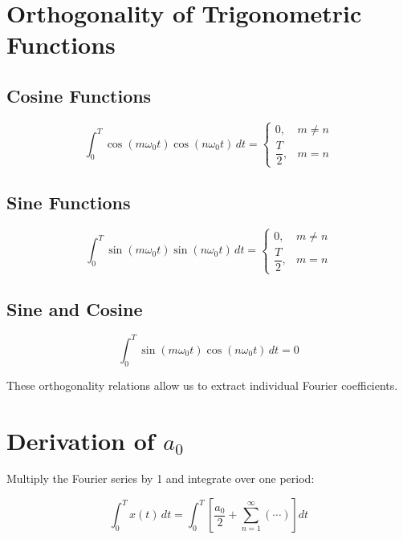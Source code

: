 \section{Orthogonality of Trigonometric Functions}


\subsection{Cosine Functions}

\[
\int_0^T
\cos(m\omega_0 t)\cos(n\omega_0 t)\,dt
=
\begin{cases}
0, & m\neq n\\[4pt]
\dfrac{T}{2}, & m=n
\end{cases}
\]


\subsection{Sine Functions}

\[
\int_0^T
\sin(m\omega_0 t)\sin(n\omega_0 t)\,dt
=
\begin{cases}
0, & m\neq n\\[4pt]
\dfrac{T}{2}, & m=n
\end{cases}
\]


\subsection{Sine and Cosine}

\[
\boxed{
\int_0^T
\sin(m\omega_0 t)\cos(n\omega_0 t)\,dt=0
}
\]

These orthogonality relations allow us to extract individual Fourier
coefficients.


\section{Derivation of \(a_0\)}

Multiply the Fourier series by 1 and integrate over one period:

\[
\int_0^T x(t)\,dt
=
\int_0^T
\left[
\frac{a_0}{2}
+\sum_{n=1}^{\infty}(\cdots)
\right]dt
\]

